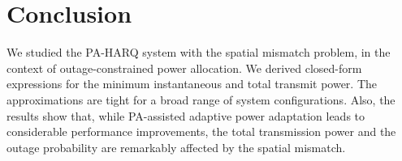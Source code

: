 \section{Conclusion}
We studied the PA-HARQ system with the spatial mismatch problem, in the context of outage-constrained power allocation. We derived  closed-form expressions for the minimum instantaneous and  total transmit power. The approximations are tight for a broad range of system configurations. Also, the  results show that, while PA-assisted adaptive power adaptation leads to considerable performance improvements, the total transmission power and the outage probability are remarkably affected by the spatial mismatch.







